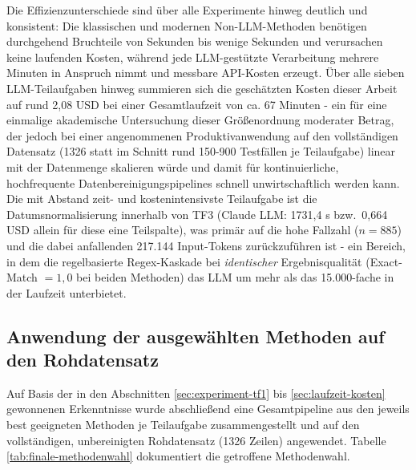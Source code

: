 Die Effizienzunterschiede sind über alle Experimente hinweg deutlich und
konsistent: Die klassischen und modernen Non-LLM-Methoden benötigen
durchgehend Bruchteile von Sekunden bis wenige Sekunden und verursachen keine
laufenden Kosten, während jede LLM-gestützte Verarbeitung mehrere Minuten in
Anspruch nimmt und messbare API-Kosten erzeugt. Über alle sieben
LLM-Teilaufgaben hinweg summieren sich die geschätzten Kosten dieser Arbeit
auf rund 2{,}08 USD bei einer Gesamtlaufzeit von ca. 67 Minuten - ein für
eine einmalige akademische Untersuchung dieser Größenordnung moderater
Betrag, der jedoch bei einer angenommenen Produktivanwendung auf den
vollständigen Datensatz (1326 statt im Schnitt rund 150-900 Testfällen je
Teilaufgabe) linear mit der Datenmenge skalieren würde und damit für
kontinuierliche, hochfrequente Datenbereinigungspipelines schnell
unwirtschaftlich werden kann. Die mit Abstand zeit- und kostenintensivste
Teilaufgabe ist die Datumsnormalisierung innerhalb von TF3 (Claude LLM:
1731{,}4 s bzw.\ 0{,}664 USD allein für diese eine Teilspalte), was primär auf
die hohe Fallzahl ($n = 885$) und die dabei anfallenden 217.144
Input-Tokens zurückzuführen ist - ein Bereich, in dem die
regelbasierte Regex-Kaskade bei \emph{identischer} Ergebnisqualität
(Exact-Match $= 1{,}0$ bei beiden Methoden) das LLM um mehr als das
15.000-fache in der Laufzeit unterbietet.

\subsection{Anwendung der ausgewählten Methoden auf den Rohdatensatz}
\label{sec:finale-anwendung}

Auf Basis der in den Abschnitten \ref{sec:experiment-tf1} bis
\ref{sec:laufzeit-kosten} gewonnenen Erkenntnisse wurde abschließend eine
Gesamtpipeline aus den jeweils best geeigneten Methoden je Teilaufgabe
zusammengestellt und auf den vollständigen, unbereinigten Rohdatensatz
(1326 Zeilen) angewendet. Tabelle \ref{tab:finale-methodenwahl} dokumentiert
die getroffene Methodenwahl.

